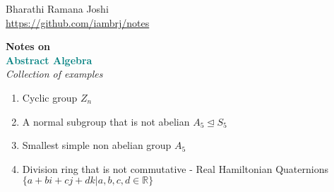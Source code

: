 \documentclass[titlepage, 12pt]{article}
\newcommand*{\logo}{\fbox{$\mathfrak{BRJ}$}}
\begin{document}
\begin{titlepage}

	\raggedleft

	\vspace*{\baselineskip}

	{Bharathi Ramana Joshi\\\url{https://github.com/iambrj/notes}}

	\vspace*{0.167\textheight}

	\textbf{\LARGE Notes on}\\[\baselineskip]

	\textbf{\textcolor{teal}{\huge Abstract Algebra}}\\[\baselineskip]

    {\Large \textit{Collection of examples}}

	\vfill

	{\large \logo}

	\vspace*{3\baselineskip}

\end{titlepage}

\newpage
    \begin{enumerate}
        \item Cyclic group $Z_n$
        \item A normal subgroup that is not abelian $A_5\trianglelefteq S_5$
        \item Smallest simple non abelian group $A_5$
        \item Division ring that is not commutative - Real Hamiltonian
            Quaternions $\{a+bi+cj+dk|a,b,c,d\in\mathbb{R}\}$
    \end{enumerate}
\end{document}
